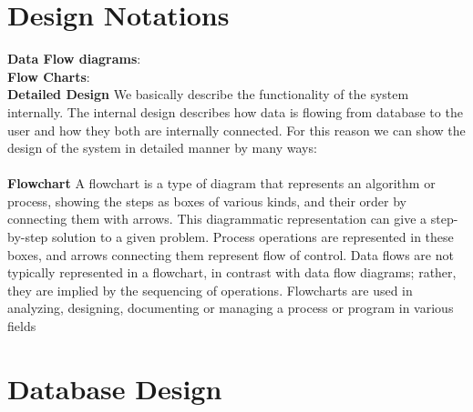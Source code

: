 \section{Design Notations}
{\bf Data Flow diagrams}:
\\
\newpage
{\bf Flow Charts}:
\\
{\centering \bf Detailed Design}
We basically describe the functionality of the system internally. 
The internal design describes how data is flowing from database to the 
user and how they both are internally connected. For this reason we 
can show the design of the system in detailed manner by many ways: \\\\
{\bf Flowchart } A flowchart is a type of diagram that represents an
algorithm or process, showing the steps as boxes of various kinds, and
their order by connecting them with arrows. This diagrammatic
representation can give a step-by-step solution to a given problem.
Process operations are represented in these boxes, and arrows
connecting them represent flow of control. Data flows are not
typically represented in a flowchart, in contrast with data flow
diagrams; rather, they are implied by the sequencing of operations.
Flowcharts are used in analyzing, designing, documenting or managing a
process or program in various fields
\newpage
\section{Database Design}

